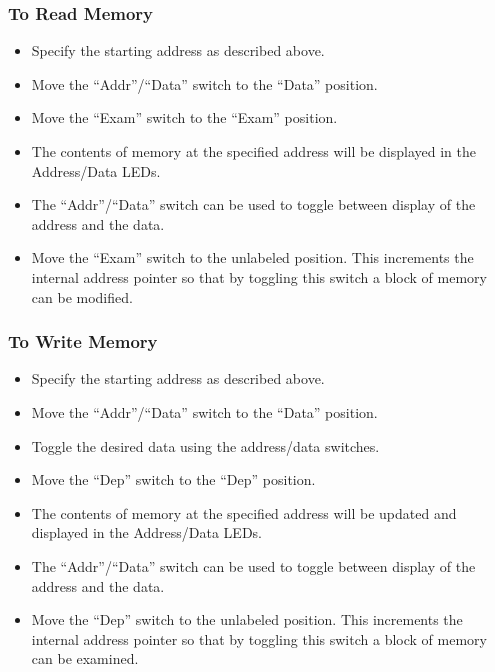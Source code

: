 \documentclass[10pt, openany]{book}
\newcommand{\switch}[2]{``#1''/``#2''}
\newcommand{\position}[1]{``#1''}
\begin{document}
\subsubsection{To Read Memory}
\begin{itemize}
  \item Specify the starting address as described above.
  \item Move the \switch{Addr}{Data} switch to the \position{Data} position.
  \item Move the ``Exam'' switch to the \position{Exam} position.
  \item The contents of memory at the specified address will be displayed in the Address/Data LEDs.
  \item The \switch{Addr}{Data}  switch can be used to toggle between display of the address and the data.
  \item Move the ``Exam'' switch to the unlabeled position.  This increments the internal address pointer so that by toggling this switch a block of memory can be modified.
\end{itemize}

\subsubsection{To Write Memory}
\begin{itemize}
  \item Specify the starting address as described above.
  \item Move the \switch{Addr}{Data}  switch to the \position{Data} position.
  \item Toggle the desired data using the address/data switches.
  \item Move the ``Dep'' switch to the \position{Dep} position.
  \item The contents of memory at the specified address will be updated and displayed in the Address/Data LEDs.
  \item The \switch{Addr}{Data} switch can be used to toggle between display of the address and the data.
  \item Move the ``Dep'' switch to the unlabeled position.  This increments the internal address pointer so that by toggling this switch a block of memory can be examined.
\end{itemize}
\end{document}
